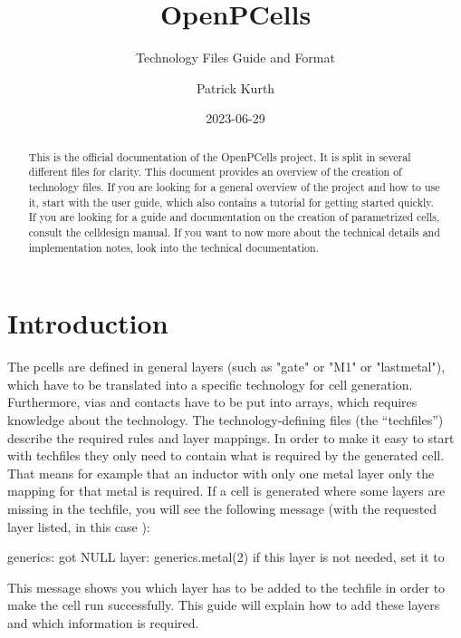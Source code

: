 

\title{OpenPCells}
\subtitle{Technology Files Guide and Format}
\author{Patrick Kurth}
\date{2023-06-29}


\maketitle
\begin{abstract}
    \noindent This is the official documentation of the OpenPCells project. It is split in several different files for clarity. 
    This document provides an overview of the creation of technology files.
    If you are looking for a general overview of the project and how to use it, start with the user guide, which also contains a tutorial for getting started quickly. 
    If you are looking for a guide and documentation on the creation of parametrized cells, consult the celldesign manual.
    If you want to now more about the technical details and implementation notes, look into the technical documentation.
\end{abstract}

\section{Introduction}

The pcells are defined in general layers (such as "gate" or "M1" or "lastmetal"), which have to be translated into a specific technology for cell generation.
Furthermore, vias and contacts have to be put into arrays, which requires knowledge about the technology.
The technology-defining files (the \enquote{techfiles}) describe the required rules and layer mappings.
In order to make it easy to start with techfiles they only need to contain what is required by the generated cell.
That means for example that an inductor with only one metal layer only the mapping for that metal is required.
If a cell is generated where some layers are missing in the techfile, you will see the following message (with the requested layer listed, in this case ):
\begin{shellcode}
    generics: got NULL layer: generics.metal(2)
    if this layer is not needed, set it to {}
\end{shellcode}
This message shows you which layer has to be added to the techfile in order to make the cell run successfully.
This guide will explain how to add these layers and which information is required.

